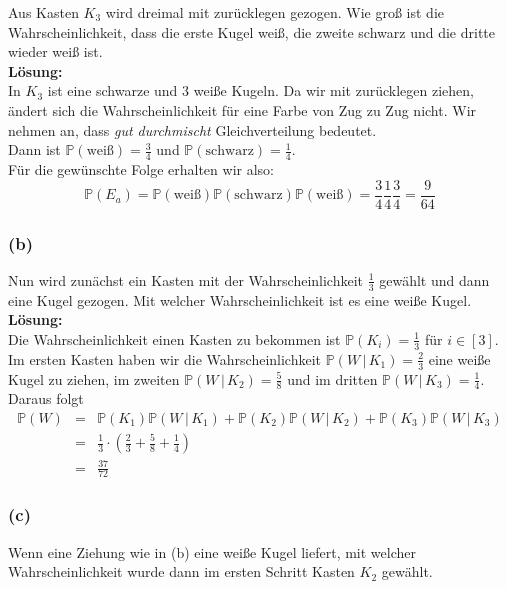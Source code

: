\documentclass[11pt,a4paper,ngerman]{article}
\newcommand{\Prob}{\mathbb{P}}
\begin{document}
Aus Kasten $K_3$ wird dreimal mit zurücklegen gezogen. Wie groß ist die Wahrscheinlichkeit, dass die erste Kugel
weiß, die zweite schwarz und die dritte wieder weiß ist.\\

\textbf{Lösung:}\\
In $K_3$ ist eine schwarze und 3 weiße Kugeln. Da wir mit zurücklegen ziehen, ändert sich die 
Wahrscheinlichkeit für eine Farbe von Zug zu Zug nicht. Wir nehmen an, dass \emph{gut durchmischt} Gleichverteilung bedeutet.\\

Dann ist $\Prob(\text{weiß}) = \frac{3}{4}$ und $\Prob(\text{schwarz}) = \frac{1}{4}$.\\
Für die gewünschte Folge erhalten wir also:
\[
    \Prob(E_a) = \Prob(\text{weiß})\Prob(\text{schwarz})\Prob(\text{weiß}) = \frac{3}{4} \frac{1}{4} \frac{3}{4} = \frac{9}{64}
\]

\subsubsection*{(b)}

Nun wird zunächst ein Kasten mit der Wahrscheinlichkeit $\frac{1}{3}$ gewählt und dann eine Kugel gezogen. Mit welcher Wahrscheinlichkeit
ist es eine weiße Kugel.\\

\textbf{Lösung:}\\

Die Wahrscheinlichkeit einen Kasten zu bekommen ist $\Prob(K_i) = \frac{1}{3}$ für $i \in [3]$.
Im ersten Kasten haben wir die Wahrscheinlichkeit
$\Prob(W \,|\, K_1) = \frac{2}{3}$ eine weiße Kugel zu ziehen, im zweiten $\Prob(W \,|\, K_2) = \frac{5}{8}$ und im dritten $\Prob(W \,|\, K_3) = \frac{1}{4}$.
Daraus folgt
\[
    \begin{array}{rcl}
    \Prob(W) &=& \Prob(K_1)\Prob(W \, | \, K_1) + \Prob(K_2)\Prob(W \, | \, K_2) + \Prob(K_3)\Prob(W \, | \, K_3)\\
            &=& \frac{1}{3} \cdot \left( \frac{2}{3} + \frac{5}{8} + \frac{1}{4} \right)\\
            &=& \frac{37}{72}
    \end{array}
\]

\subsubsection*{(c)}

Wenn eine Ziehung wie in (b) eine weiße Kugel liefert, mit welcher Wahrscheinlichkeit wurde dann im ersten Schritt Kasten $K_2$ gewählt.\\
\end{document}
